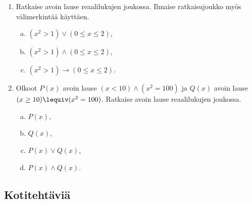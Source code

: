 \begin{enumerate}
\item Ratkaise avoin lause reaalilukujen joukossa. Ilmaise ratkaisujoukko myös välimerkintää käyttäen.
\begin{enumerate}[a)]
\item $(x^2 > 1) \lor (0 \le x \le 2)$,
\item $(x^2 > 1) \land (0 \le x \le 2)$,
\item $(x^2 > 1) \to (0 \le x \le 2)$.
\end{enumerate}

\item
Olkoot $P(x)$ avoin lause $(x < 10) \land (x^2 = 100)$ ja
$Q(x)$ avoin lause $(x \ge 10) \lequiv (x^2 = 100)$. Ratkaise avoin lause reaalilukujen joukossa.
\begin{enumerate}[a)]
\item $P(x)$,
\item $Q(x)$,
\item $P(x) \lor Q(x)$,
\item $P(x) \land Q(x)$.
\end{enumerate}


\end{enumerate}

\subsection*{Kotitehtäviä}

